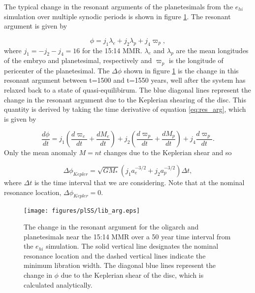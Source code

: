 The typical change in the resonant arguments of the planetesimals from the $e_{hi}$ simulation over multiple synodic periods is 
shown in figure \ref{fig:lib_arg}. The resonant argument is given by \cite{murray00}

\begin{equation}\label{eq:res_arg}
    \phi = j_{1} \lambda_{e} + j_{2} \lambda_{p} + j_{4} \varpi_{p},
\end{equation} where $j_{1} = -j_{2} - j_{4} = 16$ for the 15:14 MMR. $\lambda_{e}$ and $\lambda_{p}$ are the mean longitudes 
of the embryo and planetesimal, respectively and $\varpi_{p}$ is the longitude of pericenter of the planetesimal. The $\Delta 
\phi$ shown in figure \ref{fig:lib_arg} is the change in this resonant argument between t=1500 and t=1550 years, well after the 
system has relaxed back to a state of quasi-equilibirum. The blue diagonal lines represent the change in the resonant argument 
due to the Keplerian shearing of the disc. This quantity is derived by taking the time derivative of equation \ref{eq:res_arg},  
which is given by

\begin{equation}\label{eq:res_arg1}
    \frac{d \phi}{dt} = j_{1} \left( \frac{d \varpi_{e}}{dt} + \frac{d M_{e}}{dt} \right) + j_{2} \left( \frac{d \varpi_{p}}{dt} + \frac{d M_{p}}{dt} \right) + j_{4} \frac{d \varpi_{p}}{dt}.
\end{equation} Only the mean anomaly $M = n t$ changes due to the Keplerian shear and so

\begin{equation}
    \Delta \phi_{Kepler} = \sqrt{G M_{*}} \left( j_{1} a_{e}^{-3/2} + j_{2} a_{p}^{-3/2} \right) \Delta t,
\end{equation} where $\Delta t$ is the time interval that we are considering. Note that at the nominal resonance location, $\Delta \phi_{Kepler} = 0$.

\begin{figure}
    \texttt{[image: figures/plSS/lib\_arg.eps]}
    \caption{The change in the resonant argument for the oligarch and planetesimals near the 15:14 MMR over a 50 year time 
    interval from the $e_{hi}$ simulation. The solid vertical line designates the nominal resonance location and the dashed vertical 
    lines indicate the minimum libration width. The diagonal blue lines represent the change in $\phi$ due to the Keplerian shear 
    of the disc, which is calculated analytically.}
    \label{fig:lib_arg}
\end{figure}

